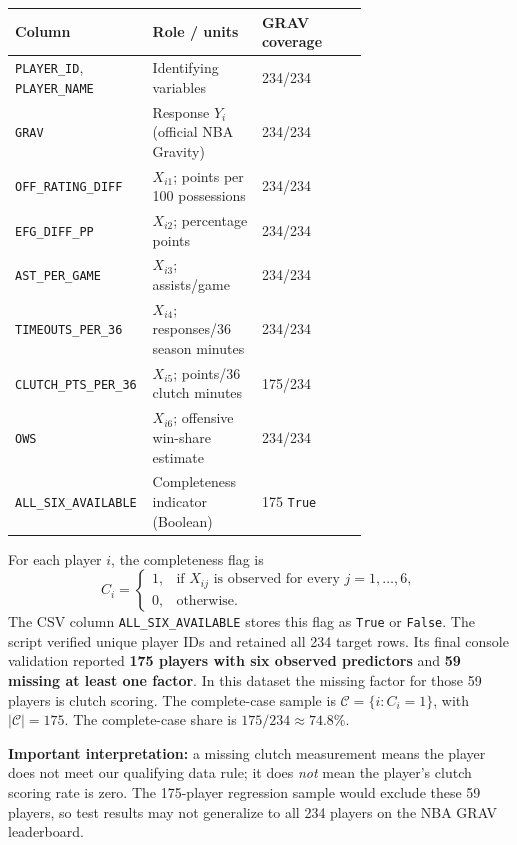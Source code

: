 \documentclass[11pt]{article}
\begin{document}
\begin{center}
\small
\begin{tabularx}{\linewidth}{@{}p{0.39\linewidth}p{0.31\linewidth}X@{}}
\toprule
\textbf{Column} & \textbf{Role / units} & \textbf{GRAV coverage}\\
\midrule
\texttt{PLAYER\_ID}, \texttt{PLAYER\_NAME} & Identifying variables & 234/234\\
\texttt{GRAV} & Response $Y_i$ (official NBA Gravity) & 234/234\\
\texttt{OFF\_RATING\_DIFF} & $X_{i1}$; points per 100 possessions & 234/234\\
\texttt{EFG\_DIFF\_PP} & $X_{i2}$; percentage points & 234/234\\
\texttt{AST\_PER\_GAME} & $X_{i3}$; assists/game & 234/234\\
\texttt{TIMEOUTS\_PER\_36} & $X_{i4}$; responses/36 season minutes & 234/234\\
\texttt{CLUTCH\_PTS\_PER\_36} & $X_{i5}$; points/36 clutch minutes & 175/234\\
\texttt{OWS} & $X_{i6}$; offensive win-share estimate & 234/234\\
\texttt{ALL\_SIX\_AVAILABLE} & Completeness indicator (Boolean) & 175 \texttt{True}\\
\bottomrule
\end{tabularx}
\end{center}

For each player $i$, the completeness flag is
\begin{equation}
 C_i=\begin{cases}
 1,&\text{if }X_{ij}\text{ is observed for every }j=1,\ldots,6,\\
 0,&\text{otherwise}.
 \end{cases}
 \label{eq:complete-case}
\end{equation}
The CSV column \texttt{ALL\_SIX\_AVAILABLE} stores this flag as
\texttt{True} or \texttt{False}. The script verified unique player IDs and
retained all 234 target rows. Its final console validation reported
\textbf{175 players with six observed predictors} and \textbf{59 missing
at least one factor}. In this dataset the missing factor for those 59
players is clutch scoring. The complete-case sample is
$\mathcal C=\{i:C_i=1\}$, with $|\mathcal C|=175$. The complete-case share
is $175/234\approx74.8\%$.

\textbf{Important interpretation:} a missing clutch measurement means
the player does not meet our qualifying data rule; it does \emph{not}
mean the player's clutch scoring rate is zero. The 175-player regression
sample would exclude these 59 players, so test results may not generalize
to all 234 players on the NBA GRAV leaderboard.
\end{document}

